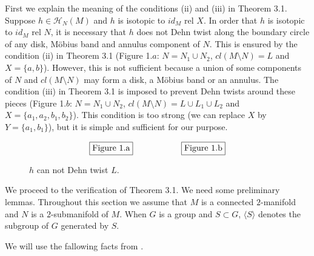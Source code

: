 \documentclass[11pt]{amsart}
\theoremstyle{definition}
\newtheorem*{Proof of Theorem 3.1}{Proof of Theorem 3.1}
\newtheorem*{Proof of Corollary 3.1}{Proof of Corollary 3.1}
\newtheorem*{Proof of Proposition 4.1.(1)}{Proof of Proposition 4.1.(1)}
\newtheorem*{Proof of Proposition 4.1.(2)}{Proof of Proposition 4.1.(2)}
\newtheorem*{Proof of Corollary 1.1}{Proof of Corollary 1.1}
\def \cal {\mathcal}
\begin{document}
First we explain the meaning of the conditions (ii) and (iii) in Theorem 3.1. 
Suppose $h \in {\cal H}_N(M)$ and $h$ is isotopic to $id_M$ rel $X$. In order that $h$ is isotopic to $id_M$ rel $N$, it is necessary that $h$ does not Dehn twist along the boundary circle of any disk, M\"obius band and annulus component of $N$. 
This is ensured by the condition (ii) in Theorem 3.1 (Figure 1.$a$: $N = N_1 \cup N_2$, $cl(M \setminus N) = L$ and $X = \{ a, b\}$). 
However, this is not sufficient because a union of some components of $N$ and $cl(M \setminus N)$ may form a disk, a M\"obius band or an annulus. 
The condition (iii) in Theorem 3.1 is imposed to prevent Dehn twists around these pieces (Figure 1.$b$: $N = N_1 \cup N_2$, $cl(M \setminus N) = L \cup L_1 \cup L_2$ and $X = \{ a_1, a_2, b_1, b_2\}$). 
This condition is too strong (we can replace $X$ by $Y = \{ a_1, b_1 \}$), but it is simple and sufficient for our purpose.

\begin{figure}[h]
\caption{$h$ can not Dehn twist $L$.}
\[ \fbox{Figure 1.a} \hspace{2cm} \fbox{Figure 1.b} \]
\end{figure}

We proceed to the verification of Theorem 3.1. We need some preliminary lemmas. Throughout this section we assume that $M$ is a connected $2$-manifold and $N$ is a $2$-submanifold of $M$. When $G$ is a group and $S \subset G$, $\langle S \rangle$ denotes the subgroup of $G$ generated by $S$. 

We will use the fallowing facts from \cite{Ep}.
\end{document}
